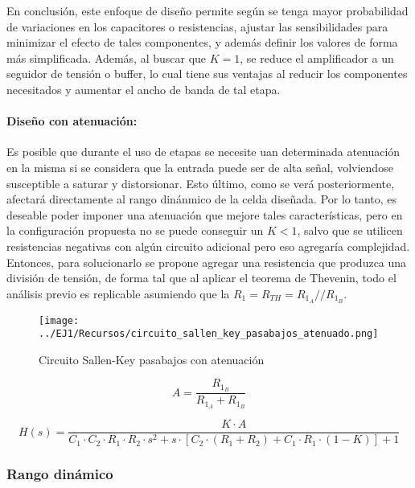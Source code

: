 En conclusi\'on, este enfoque de dise\~no permite seg\'un se tenga mayor probabilidad de variaciones en los capacitores o resistencias, ajustar las sensibilidades para minimizar el efecto de tales componentes,
y adem\'as definir los valores de forma m\'as simplificada. Adem\'as, al buscar que $K = 1$, se reduce el amplificador a un seguidor de tensi\'on o buffer, lo cual tiene sus ventajas al reducir los componentes necesitados
y aumentar el ancho de banda de tal etapa.

\paragraph{Dise\~no con atenuaci\'on:} Es posible que durante el uso de etapas se necesite uan determinada atenuaci\'on en la misma si se considera que la entrada puede ser de alta se\~nal, volviendose susceptible a saturar
y distorsionar. Esto \'ultimo, como se ver\'a posteriormente, afectar\'a directamente al rango din\'anmico de la celda dise\~nada. Por lo tanto, es deseable poder imponer una atenuaci\'on que mejore tales caracter\'isticas, pero en la
configuraci\'on propuesta no se puede conseguir un $K < 1$, salvo que se utilicen resistencias negativas con alg\'un circuito adicional pero eso agregar\'ia complejidad. Entonces, para solucionarlo se propone agregar una resistencia que produzca
una divisi\'on de tensi\'on, de forma tal que al aplicar el teorema de Thevenin, todo el an\'alisis previo es replicable asumiendo que la $R_1 = R_{TH} = R_{1_A} // R_{1_B}$.

\begin{figure}[H]
    \centering
    \texttt{[image: ../EJ1/Recursos/circuito\_sallen\_key\_pasabajos\_atenuado.png]}
    \caption{Circuito Sallen-Key pasabajos con atenuaci\'on}
    \label{fig:sallen_key_pasabajos_atenuado}
\end{figure}

\begin{equation}
    A = \frac{R_{1_B}}{R_{1_A} + R_{1_B}}
\end{equation}

\begin{equation}
    H(s) = \frac{K \cdot A}{C_1 \cdot C_2 \cdot R_1 \cdot R_2 \cdot s^{2} + s \cdot \left[ C_2 \cdot (R_1 + R_2) + C_1 \cdot R_1 \cdot (1 - K) \right] + 1}
    \label{eq:sallen_key_h_atenuada}
\end{equation}

\subsubsection{Rango din\'amico}

